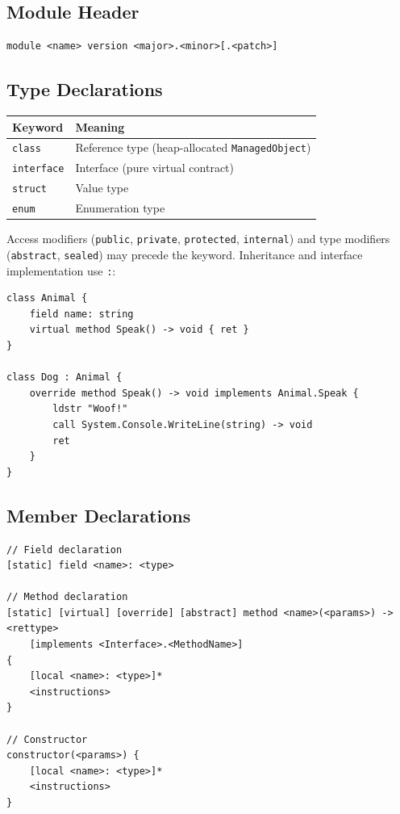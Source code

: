 \documentclass[11pt,a4paper]{article}
\newcommand{\typename}[1]{\textcolor{typecolor}{\texttt{\small #1}}}
\begin{document}
\subsection{Module Header}

\begin{lstlisting}[style=textir]
module <name> version <major>.<minor>[.<patch>]
\end{lstlisting}

\subsection{Type Declarations}

\begin{center}
\begin{tabular}{ll}
  \toprule
  \textbf{Keyword} & \textbf{Meaning} \\
  \midrule
  \texttt{class}     & Reference type (heap-allocated \typename{ManagedObject}) \\
  \texttt{interface} & Interface (pure virtual contract) \\
  \texttt{struct}    & Value type \\
  \texttt{enum}      & Enumeration type \\
  \bottomrule
\end{tabular}
\end{center}

Access modifiers (\texttt{public}, \texttt{private}, \texttt{protected},
\texttt{internal}) and type modifiers (\texttt{abstract}, \texttt{sealed})
may precede the keyword. Inheritance and interface implementation use
\texttt{:}:

\begin{lstlisting}[style=textir]
class Animal {
    field name: string
    virtual method Speak() -> void { ret }
}

class Dog : Animal {
    override method Speak() -> void implements Animal.Speak {
        ldstr "Woof!"
        call System.Console.WriteLine(string) -> void
        ret
    }
}
\end{lstlisting}

\subsection{Member Declarations}

\begin{lstlisting}[style=textir]
// Field declaration
[static] field <name>: <type>

// Method declaration
[static] [virtual] [override] [abstract] method <name>(<params>) -> <rettype>
    [implements <Interface>.<MethodName>]
{
    [local <name>: <type>]*
    <instructions>
}

// Constructor
constructor(<params>) {
    [local <name>: <type>]*
    <instructions>
}
\end{lstlisting}
\end{document}
